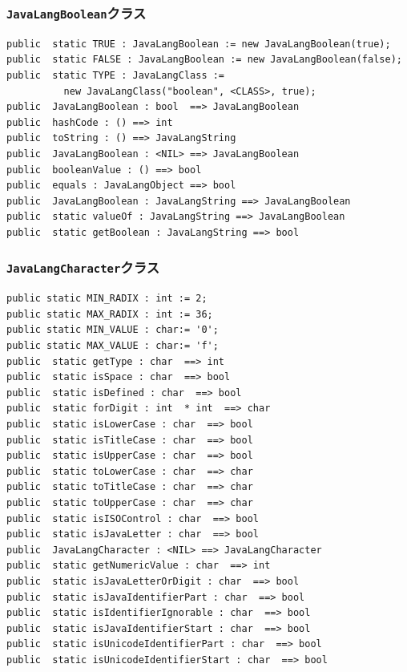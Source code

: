 \documentclass[\pformat,12pt]{jarticle}
\begin{document}
\subsubsection{\texttt{JavaLangBoolean}クラス}
\begin{small}
\begin{verbatim}
public  static TRUE : JavaLangBoolean := new JavaLangBoolean(true);
public  static FALSE : JavaLangBoolean := new JavaLangBoolean(false);
public  static TYPE : JavaLangClass := 
          new JavaLangClass("boolean", <CLASS>, true);
public  JavaLangBoolean : bool  ==> JavaLangBoolean
public  hashCode : () ==> int
public  toString : () ==> JavaLangString
public  JavaLangBoolean : <NIL> ==> JavaLangBoolean
public  booleanValue : () ==> bool
public  equals : JavaLangObject ==> bool
public  JavaLangBoolean : JavaLangString ==> JavaLangBoolean
public  static valueOf : JavaLangString ==> JavaLangBoolean
public  static getBoolean : JavaLangString ==> bool
\end{verbatim}
\end{small}

\subsubsection{\texttt{JavaLangCharacter}クラス}
\begin{small}
\begin{verbatim}
public static MIN_RADIX : int := 2;
public static MAX_RADIX : int := 36;
public static MIN_VALUE : char:= '0';
public static MAX_VALUE : char:= 'f';
public  static getType : char  ==> int
public  static isSpace : char  ==> bool
public  static isDefined : char  ==> bool
public  static forDigit : int  * int  ==> char
public  static isLowerCase : char  ==> bool
public  static isTitleCase : char  ==> bool
public  static isUpperCase : char  ==> bool
public  static toLowerCase : char  ==> char
public  static toTitleCase : char  ==> char
public  static toUpperCase : char  ==> char
public  static isISOControl : char  ==> bool
public  static isJavaLetter : char  ==> bool
public  JavaLangCharacter : <NIL> ==> JavaLangCharacter
public  static getNumericValue : char  ==> int
public  static isJavaLetterOrDigit : char  ==> bool
public  static isJavaIdentifierPart : char  ==> bool
public  static isIdentifierIgnorable : char  ==> bool
public  static isJavaIdentifierStart : char  ==> bool
public  static isUnicodeIdentifierPart : char  ==> bool
public  static isUnicodeIdentifierStart : char  ==> bool
\end{verbatim}
\end{small}
\end{document}
